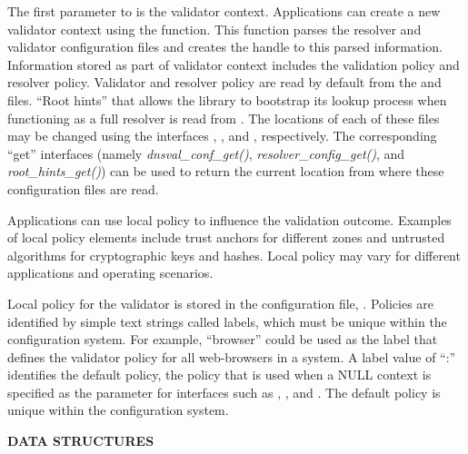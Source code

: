 The first parameter to  is the validator
context.  Applications can create a new validator context using the
 function.  This function parses the resolver and
validator configuration files and creates the handle  to this
parsed information.  Information stored as part of validator context includes
the validation policy and resolver policy.  Validator and resolver policy are
read by default from the  and 
files.  ``Root hints'' that allows the library to bootstrap its lookup process
when functioning as a full resolver is read from .  The
locations of each of these files may be changed using the
interfaces , , and
, respectively.  The corresponding ``get'' interfaces
(namely {\it dnsval\_conf\_get()}, {\it resolver\_config\_get()}, and {\it
root\_hints\_get()}) can be used to return the current location from where
these configuration files are read.

Applications can use local policy to influence the validation outcome.
Examples of local policy elements include trust anchors for different zones
and untrusted algorithms for cryptographic keys and hashes.  Local policy may
vary for different applications and operating scenarios.

Local policy for the validator is stored in the configuration file,
.  Policies are identified by simple text strings
called labels, which must be unique within the configuration system.  For
example, ``browser'' could be used as the label that defines the validator
policy for all web-browsers in a system.  A label value of ``:'' identifies
the default policy, the policy that is used when a NULL context is specified
as the  parameter for interfaces such as
, , and
.  The default policy is unique within the
configuration system.

{\bf DATA STRUCTURES}

